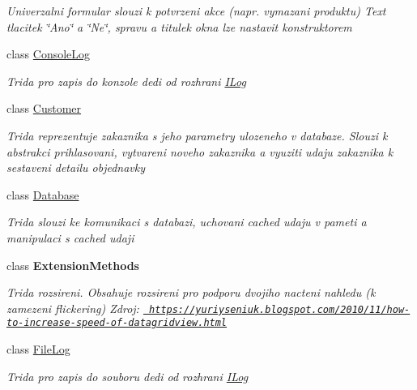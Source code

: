 \begin{DoxyCompactItemize}
\begin{DoxyCompactList}\small\item\em Univerzalni formular slouzi k potvrzeni akce (napr. vymazani produktu) Text tlacitek \char`\"{}\+Ano\char`\"{} a \char`\"{}\+Ne\char`\"{}, spravu a titulek okna lze nastavit konstruktorem \end{DoxyCompactList}\item 
class \mbox{\hyperlink{class_eshop_1_1_console_log}{Console\+Log}}
\begin{DoxyCompactList}\small\item\em Trida pro zapis do konzole dedi od rozhrani \mbox{\hyperlink{interface_eshop_1_1_i_log}{I\+Log}} \end{DoxyCompactList}\item 
class \mbox{\hyperlink{class_eshop_1_1_customer}{Customer}}
\begin{DoxyCompactList}\small\item\em Trida reprezentuje zakaznika s jeho parametry ulozeneho v databaze. Slouzi k abstrakci prihlasovani, vytvareni noveho zakaznika a vyuziti udaju zakaznika k sestaveni detailu objednavky \end{DoxyCompactList}\item 
class \mbox{\hyperlink{class_eshop_1_1_database}{Database}}
\begin{DoxyCompactList}\small\item\em Trida slouzi ke komunikaci s databazi, uchovani cached udaju v pameti a manipulaci s cached udaji \end{DoxyCompactList}\item 
class {\bfseries Extension\+Methods}
\begin{DoxyCompactList}\small\item\em Trida rozsireni. Obsahuje rozsireni pro podporu dvojiho nacteni nahledu (k zamezeni flickering) Zdroj\+: \href{https://yuriyseniuk.blogspot.com/2010/11/how-to-increase-speed-of-datagridview.html}{\texttt{ https\+://yuriyseniuk.\+blogspot.\+com/2010/11/how-\/to-\/increase-\/speed-\/of-\/datagridview.\+html}} \end{DoxyCompactList}\item 
class \mbox{\hyperlink{class_eshop_1_1_file_log}{File\+Log}}
\begin{DoxyCompactList}\small\item\em Trida pro zapis do souboru dedi od rozhrani \mbox{\hyperlink{interface_eshop_1_1_i_log}{I\+Log}} \end{DoxyCompactList}\item 

\end{DoxyCompactItemize}
